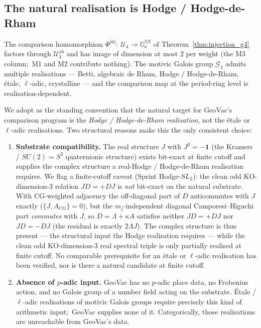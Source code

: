 \documentclass[11pt,a4paper]{article}
\theoremstyle{plain}
\theoremstyle{definition}
\newcommand{\Ga}{\mathbb{G}_{a}}
\begin{document}
\subsection{The natural realisation is Hodge / Hodge-de-Rham}\label{sec:open_g4_hodge}

The comparison homomorphism $\Phi^{\mathrm{inj}}:\ \mathcal{U}_4 \to \Ga^{3N}$ of
Theorem~\ref{thm:injection_g4} factors through $\mathcal{U}_4^{\mathrm{ab}}$ and has
image of dimension at most $2$ per weight (the M3 column;\ M1 and M2 contribute
nothing).  The motivic Galois
group $\mathcal{G}_4$ admits multiple realisations --- Betti,
algebraic de Rham, Hodge / Hodge-de-Rham, étale, $\ell$-adic,
crystalline --- and the comparison map at the period-ring level is
realisation-dependent.

We adopt as the standing convention that the natural target for
GeoVac's comparison program is the \emph{Hodge / Hodge-de-Rham
realisation}, not the étale or $\ell$-adic realisations.  Two
structural reasons make this the only consistent choice:

\begin{enumerate}
\item \textbf{Substrate compatibility.}  The real structure $J$ with
$J^2 = -\mathbf{1}$ (the Kramers / $SU(2) = S^3$ quaternionic structure)
exists bit-exact at finite cutoff and supplies the complex structure a
real-Hodge / Hodge-de-Rham realisation requires.  We flag a finite-cutoff
caveat (Sprint Hodge-$SL_2$):
the clean odd KO-dimension-$3$ relation $J D = + D J$ is \emph{not}
bit-exact on the natural substrate.  With CG-weighted adjacency the
off-diagonal part of $D$ anticommutes with $J$ exactly ($\{J, A_{CG}\} =
0$), but the $m_j$-independent diagonal Camporesi--Higuchi part
\emph{commutes} with $J$, so $D = \Lambda + \kappa A$ satisfies neither
$JD = +DJ$ nor $JD = -DJ$ (the residual is exactly $2\Lambda J$).  The
complex structure is thus present --- the structural input the Hodge
realisation requires --- while the clean odd KO-dimension-$3$ real
spectral triple is only partially realised at finite cutoff.  No
comparable prerequisite for an étale or $\ell$-adic realisation has been
verified, nor is there a natural candidate at finite cutoff.
\item \textbf{Absence of $p$-adic input.}  GeoVac has no $p$-adic
place data, no Frobenius action, and no Galois group of a number
field acting on the substrate.  Étale / $\ell$-adic realisations
of motivic Galois groups require precisely this kind of arithmetic
input;\ GeoVac supplies none of it.  Categorically, those
realisations are unreachable from GeoVac's data.
\end{enumerate}
\end{document}
